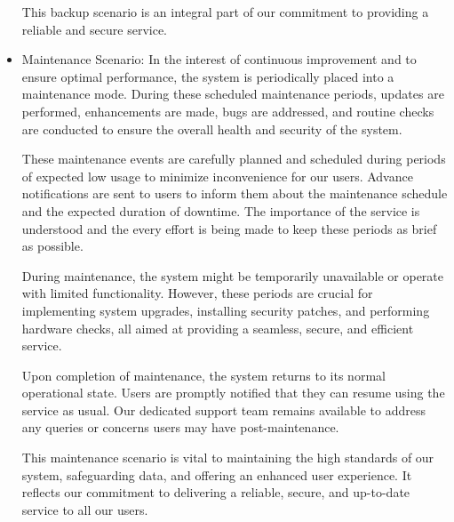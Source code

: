 \begin{itemize}
This backup scenario is an integral part of our commitment to providing a reliable and secure service.
    \item Maintenance Scenario: In the interest of continuous improvement and to ensure optimal performance, the system is periodically placed into a maintenance mode. During these scheduled maintenance periods, updates are performed, enhancements are made, bugs are addressed, and routine checks are conducted to ensure the overall health and security of the system.

These maintenance events are carefully planned and scheduled during periods of expected low usage to minimize inconvenience for our users. Advance notifications are sent to users to inform them about the maintenance schedule and the expected duration of downtime. The importance of the service is understood and the every effort is being made to keep these periods as brief as possible.

During maintenance, the system might be temporarily unavailable or operate with limited functionality. However, these periods are crucial for implementing system upgrades, installing security patches, and performing hardware checks, all aimed at providing a seamless, secure, and efficient service.

Upon completion of maintenance, the system returns to its normal operational state. Users are promptly notified that they can resume using the service as usual. Our dedicated support team remains available to address any queries or concerns users may have post-maintenance.

This maintenance scenario is vital to maintaining the high standards of our system, safeguarding data, and offering an enhanced user experience. It reflects our commitment to delivering a reliable, secure, and up-to-date service to all our users.
\end{itemize}

